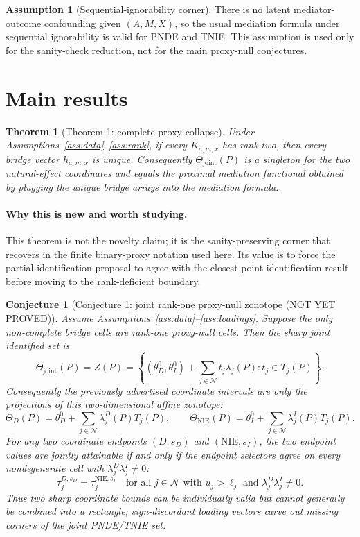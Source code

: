\documentclass[11pt]{article}
\theoremstyle{definition}
\newtheorem{assumption}{Assumption}
\theoremstyle{plain}
\newtheorem{theorem}{Theorem}
\newtheorem{conjecture}{Conjecture}
\theoremstyle{remark}
\begin{document}
\begin{assumption}[Sequential-ignorability corner]\label{ass:seq-ignorability}
There is no latent mediator-outcome confounding given \((A,M,X)\), so the usual mediation formula under sequential ignorability is valid for PNDE and TNIE.  This assumption is used only for the sanity-check reduction, not for the main proxy-null conjectures.
\end{assumption}

\section{Main results}
\begin{theorem}[Theorem 1: complete-proxy collapse]\label{thm:complete-collapse}
Under Assumptions~\ref{ass:data}--\ref{ass:rank}, if every \(K_{a,m,x}\) has rank two, then every bridge vector \(h_{a,m,x}\) is unique.  Consequently \(\Theta_{\mathrm{joint}}(P)\) is a singleton for the two natural-effect coordinates and equals the proximal mediation functional obtained by plugging the unique bridge arrays into the mediation formula.
\end{theorem}

\paragraph{Why this is new and worth studying.}
This theorem is not the novelty claim; it is the sanity-preserving corner that recovers \citet{DukesShpitserTchetgen2023} in the finite binary-proxy notation used here.  Its value is to force the partial-identification proposal to agree with the closest point-identification result before moving to the rank-deficient boundary.

\begin{conjecture}[Conjecture 1: joint rank-one proxy-null zonotope (NOT YET PROVED)]\label{conj:joint-null}
Assume Assumptions~\ref{ass:data}--\ref{ass:loadings}.  Suppose the only non-complete bridge cells are rank-one proxy-null cells.  Then the sharp joint identified set is
\[
\Theta_{\mathrm{joint}}(P)=Z(P)
=\left\{(\theta^0_D,\theta^0_I)+\sum_{j\in\mathcal N}t_j\lambda_j(P):t_j\in T_j(P)\right\}.
\]
Consequently the previously advertised coordinate intervals are only the projections of this two-dimensional affine zonotope:
\[
\Theta_D(P)=\theta^0_D+\sum_{j\in\mathcal N}\lambda^D_j(P)T_j(P),\qquad
\Theta_{\mathrm{NIE}}(P)=\theta^0_I+\sum_{j\in\mathcal N}\lambda^I_j(P)T_j(P).
\]
For any two coordinate endpoints \((D,s_D)\) and \((\mathrm{NIE},s_I)\), the two endpoint values are jointly attainable if and only if the endpoint selectors agree on every nondegenerate cell with \(\lambda^D_j\lambda^I_j\neq0\):
\[
\tau^{D,s_D}_j=\tau^{\mathrm{NIE},s_I}_j
\quad\text{for all }j\in\mathcal N\text{ with }u_j>\ell_j\text{ and }\lambda^D_j\lambda^I_j\neq0.
\]
Thus two sharp coordinate bounds can be individually valid but cannot generally be combined into a rectangle; sign-discordant loading vectors carve out missing corners of the joint PNDE/TNIE set.
\end{conjecture}
\end{document}
